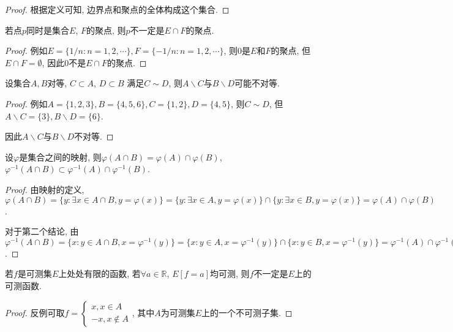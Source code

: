 \documentclass[theorem=false,mathfont=none,openany,sub3section]{easybook}
\begin{document}
\begin{proof}
  根据定义可知, 边界点和聚点的全体构成这个集合.
\end{proof}

\begin{example}
  若点$p$同时是集合$E$, $F$的聚点, 则$p$不一定是$E \cap F$的聚点.
\end{example}

\begin{proof}
  例如$E=\{1/n: n=1,2,\cdots\}, F=\{-1/n: n=1,2,\cdots\}$, 则$0$是$E$和$F$的聚点, 但$E \cap F = \emptyset$, 因此$0$不是$E \cap F$的聚点.\par
\end{proof}

\begin{example}
  设集合$A, B$对等, $C \subset A$, $D \subset B$ 满足$C \sim D$, 则$A \backslash C$与$B \backslash D$可能不对等.
\end{example}

\begin{proof}
  例如$A=\{1,2,3\}, B=\{4,5,6\}, C=\{1,2\}, D=\{4,5\}$, 则$C \sim D$, 但$A \backslash C = \{3\}, B \backslash D = \{6\}$.\par
  因此$A \backslash C$与$B \backslash D$不对等.\par
\end{proof}

\begin{example}
  设$\varphi$是集合之间的映射, 则$\varphi(A\cap B) = \varphi(A) \cap \varphi(B)$, $\varphi^{-1}(A \cap B) \subset \varphi^{-1}(A) \cap \varphi^{-1}(B)$.
\end{example}

\begin{proof}
  由映射的定义, $\varphi(A\cap B) = \{y: \exists x\in A\cap B, y=\varphi(x)\} = \{y: \exists x\in A, y=\varphi(x)\} \cap \{y: \exists x\in B, y=\varphi(x)\} = \varphi(A) \cap \varphi(B)$.\par
  对于第二个结论, 由$\varphi^{-1}(A \cap B) = \{x: y\in A\cap B, x=\varphi^{-1}(y)\} = \{x: y\in A, x=\varphi^{-1}(y)\} \cap \{x: y\in B, x=\varphi^{-1}(y)\} = \varphi^{-1}(A) \cap \varphi^{-1}(B)$.\par
\end{proof}

\begin{example}
  若$f$是可测集$E$上处处有限的函数, 若$\forall a\in \mathbb{R}$, $E[f = a]$均可测, 则$f$不一定是$E$上的可测函数.
\end{example}

\begin{proof}
  反例可取$f=\begin{cases}
    x, x\in A\\
    -x, x\notin A
  \end{cases}$, 其中$A$为可测集$E$上的一个不可测子集.\par
\end{proof}
\end{document}
